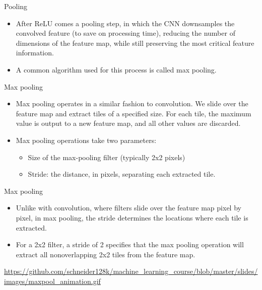 \documentclass{beamer}
\begin{document}
\begin{frame}{Pooling}
\begin{itemize}
\item After ReLU comes a pooling step, in which the CNN downsamples the convolved feature (to save on processing time), reducing the number of dimensions of the feature map, while still preserving the most critical feature information. 
\item A common algorithm used for this process is called max pooling.
\end{itemize}
\end{frame}

%

\begin{frame}{Max pooling}
\begin{itemize}
\item Max pooling operates in a similar fashion to convolution. We slide over the feature map and extract tiles of a specified size. For each tile, the maximum value is output to a new feature map, and all other values are discarded. 
\item Max pooling operations take two parameters:
\begin{itemize}
\item Size of the max-pooling filter (typically 2x2 pixels)
\item Stride: the distance, in pixels, separating each extracted tile. 
\end{itemize}
\end{itemize}
\end{frame}

%

\begin{frame}{Max pooling}
\begin{itemize}
\item Unlike with convolution, where filters slide over the feature map pixel by pixel, in max pooling, the stride determines the locations where each tile is extracted. 
\item For a 2x2 filter, a stride of 2 specifies that the max pooling operation will extract all nonoverlapping 2x2 tiles from the feature map.
\end{itemize}

{\tiny \url{https://github.com/schneider128k/machine_learning_course/blob/master/slides/images/maxpool_animation.gif}}
\end{frame}

%
\end{document}

